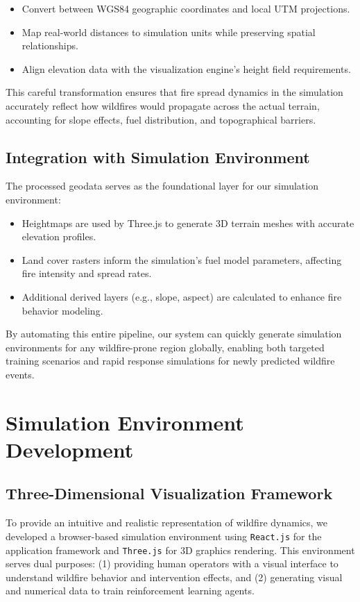\documentclass[conference]{IEEEtran}
\begin{document}
\begin{itemize}
    \item Convert between WGS84 geographic coordinates and local UTM projections.
    \item Map real-world distances to simulation units while preserving spatial relationships.
    \item Align elevation data with the visualization engine's height field requirements.
\end{itemize}

\noindent
This careful transformation ensures that fire spread dynamics in the simulation accurately reflect how wildfires would propagate across the actual terrain, accounting for slope effects, fuel distribution, and topographical barriers.

\subsection{Integration with Simulation Environment}
The processed geodata serves as the foundational layer for our simulation environment:

\begin{itemize}
    \item Heightmaps are used by Three.js to generate 3D terrain meshes with accurate elevation profiles.
    \item Land cover rasters inform the simulation's fuel model parameters, affecting fire intensity and spread rates.
    \item Additional derived layers (e.g., slope, aspect) are calculated to enhance fire behavior modeling.
\end{itemize}

\noindent
By automating this entire pipeline, our system can quickly generate simulation environments for any wildfire-prone region globally, enabling both targeted training scenarios and rapid response simulations for newly predicted wildfire events.

\section{Simulation Environment Development}

\subsection{Three-Dimensional Visualization Framework}
To provide an intuitive and realistic representation of wildfire dynamics, we developed a browser-based simulation environment using \texttt{React.js} for the application framework and \texttt{Three.js} for 3D graphics rendering. This environment serves dual purposes: (1) providing human operators with a visual interface to understand wildfire behavior and intervention effects, and (2) generating visual and numerical data to train reinforcement learning agents.
\end{document}
